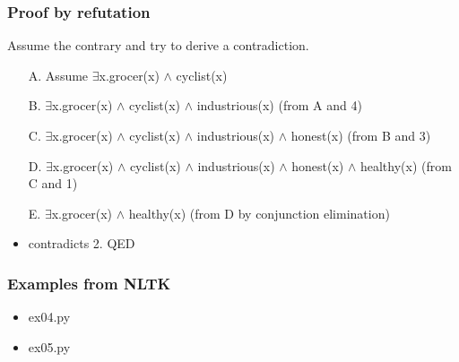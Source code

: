 \documentclass{beamer}
\newcommand{\bblue}[1]{{\usebeamercolor[fg]{frametitle}{#1}}}
\begin{document}
\begin{frame}

\frametitle{Proof by refutation}

Assume the contrary and try to derive a contradiction.

\begin{itemize}

\item[A.] Assume $\exists$x.grocer(x) $\wedge$ cyclist(x) 

\item[B.] $\exists$x.grocer(x) $\wedge$ cyclist(x) $\wedge$ industrious(x) (from A and 4) 

\item[C.] $\exists$x.grocer(x) $\wedge$ cyclist(x) $\wedge$ industrious(x) $\wedge$ honest(x) (from B and 3) 

\item[D.] $\exists$x.grocer(x) $\wedge$ cyclist(x) $\wedge$ industrious(x) $\wedge$ honest(x) $\wedge$ healthy(x) (from C and 1) 

\item[E.] $\exists$x.grocer(x) $\wedge$ healthy(x) (from D by conjunction elimination) 

\item \bigskip \bblue{E} contradicts 2. QED

\end{itemize}


\end{frame}





\begin{frame}

\frametitle{Examples from NLTK}

\begin{itemize}

\item ex04.py

\item ex05.py

\end{itemize}


\end{frame}


\end{document}
